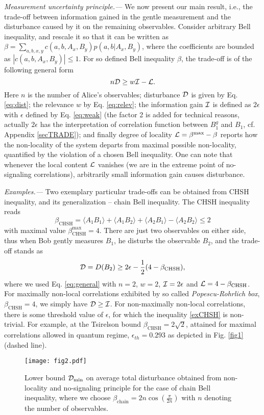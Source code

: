 \documentclass[pra,twocolumn,showpacs,preprintnumbers,amsmath,amssymb,superscriptaddress]{revtex4-1}
\def\be{\begin{equation}}
\def\ee{\end{equation}}
\def\>{\rangle}
\def\<{\langle}
\def\omeas{B_1}
\def\ogentle{B_1^g}
\def\chsh{\beta_{\text{CHSH}}}
\def\chshMax{\beta^{\max}_{\text{CHSH}}}
\def\chain{\beta_{\text{chain}}}
\def\betaMax{\beta^{\max}}
\def\dist{{\cal D}}
\def\loc{{\cal L}}
\def\inf{{\cal I}}
\def\relev{w}
\begin{document}
\textit{Measurement uncertainty principle.---}
We now present our main result, i.e., the trade-off between information gained in the gentle measurement and the disturbance caused by it on the remaining observables. Consider arbitrary Bell inequality, and rescale it so that it can be written as $\beta=\sum_{a,b,x,y} c(a,b,A_x,B_y) p(a,b|A_x,B_y)$, where the coefficients are bounded as $|c(a,b,A_x,B_y)| \leq 1$. For so defined Bell inequality $\beta$, the trade-off is of the following general form
\be
n \dist \geq  \relev \inf-  \loc.
\label{eq:general}
\ee
Here $n$ is the number of Alice's observables; disturbance $\dist$ is given by Eq. \eqref{eq:dist}; the relevance $\relev$ by Eq. \eqref{eq:relev}; the information gain $\inf$ is
defined as $2 \epsilon$ with  $\epsilon$  defined by Eq. \eqref{eq:weak}
(the factor 2 is added for technical reasons, actually $2\epsilon$ has the interpretation of correlation
function between $\ogentle$ and $\omeas$, cf. Appendix \ref{secTRADE});
and finally degree of locality ${\loc} = \betaMax - \beta$ reports how the non-locality of the system departs from maximal possible non-locality, quantified by the violation of a chosen Bell inequality. One can note that whenever the local content $\loc$ vanishes (we are in the extreme point of no-signaling correlations), arbitrarily small information gain causes disturbance.


\textit{Examples.---}
Two exemplary particular trade-offs can be obtained from CHSH inequality, and its generalization -- chain Bell inequality.
The CHSH inequality reads
\be
\chsh=\< A_1 B_1\> + \< A_1 B_2\> + \< A_2 B_1\> - \< A_2 B_2\> \leq 2
\ee
with maximal value $\chshMax=4$.
There are just two observables on either side, thus when Bob gently measures $\omeas$, he disturbs the observable $B_2$, and
the trade-off stands as
\be\label{exCHSH}
{\dist} = D(B_2) \geq 2 \epsilon -\frac12 (4- \chsh),
\ee
where we used Eq. \eqref{eq:general} with $n=2$, $\relev=2$,  $\inf= 2 \epsilon$ and ${\loc} = 4 - \chsh$. For maximally non-local correlations exhibited by so called {\it Popescu-Rohrlich box}, $\chsh=4$,
we simply have $ {\dist} \geq {\inf}$. For non-maximally non-local correlations,  there is some threshold value of $\epsilon$,
for which the inequality \eqref{exCHSH} is non-trivial. For example, at the Tsirelson bound $\chsh=2 \sqrt{2}$, attained for maximal correlations allowed in quantum regime, $\epsilon_{th}=0.293$ as depicted in Fig. \ref{fig1} (dashed line).

\begin{figure}
\centering
\texttt{[image: fig2.pdf]}
\caption{Lower bound $\dist_{\min}$ on average total disturbance obtained from non-locality and no-signaling principle for the case of chain Bell inequality, where we choose $\chain=2 n \cos(\frac{\pi}{2 n})$ \cite{Wehner2006} with $n$ denoting the number of observables.}
\label{fig2}
\end{figure}
\end{document}
